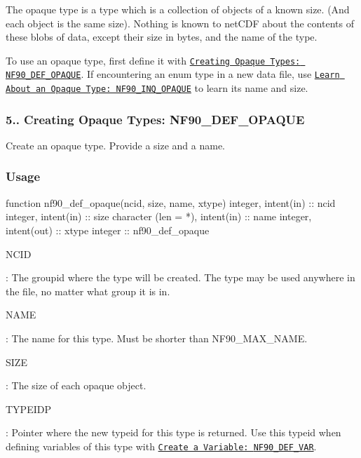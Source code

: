 The opaque type is a type which is a collection of objects of a known size. (And each object is the same size). Nothing is known to net\+C\+DF about the contents of these blobs of data, except their size in bytes, and the name of the type.

To use an opaque type, first define it with \href{#NF90_005fDEF_005fOPAQUE}{\tt Creating Opaque Types\+: N\+F90\+\_\+\+D\+E\+F\+\_\+\+O\+P\+A\+Q\+UE}. If encountering an enum type in a new data file, use \href{#NF90_005fINQ_005fOPAQUE}{\tt Learn About an Opaque Type\+: N\+F90\+\_\+\+I\+N\+Q\+\_\+\+O\+P\+A\+Q\+UE} to learn its name and size.\hypertarget{f90-user-defined-data-types_f90-creating-opaque-types-nf90_def_opaque}{}\subsubsection{5.. Creating Opaque Types\+: N\+F90\+\_\+\+D\+E\+F\+\_\+\+O\+P\+A\+Q\+UE}\label{f90-user-defined-data-types_f90-creating-opaque-types-nf90_def_opaque}
Create an opaque type. Provide a size and a name.

\subsubsection*{Usage}


\begin{DoxyCode}
\textcolor{keyword}{function }nf90\_def\_opaque(ncid, size, name, xtype)
  \textcolor{keywordtype}{integer}, \textcolor{keywordtype}{intent(in)} :: ncid
  \textcolor{keywordtype}{integer}, \textcolor{keywordtype}{intent(in)} :: size
  \textcolor{keywordtype}{character (len = *)}, \textcolor{keywordtype}{intent(in)} :: name
  \textcolor{keywordtype}{integer}, \textcolor{keywordtype}{intent(out)} :: xtype
  \textcolor{keywordtype}{integer} :: nf90\_def\_opaque
\end{DoxyCode}


{\ttfamily N\+C\+ID}

\+: The groupid where the type will be created. The type may be used anywhere in the file, no matter what group it is in.

{\ttfamily N\+A\+ME}

\+: The name for this type. Must be shorter than N\+F90\+\_\+\+M\+A\+X\+\_\+\+N\+A\+ME.

{\ttfamily S\+I\+ZE}

\+: The size of each opaque object.

{\ttfamily T\+Y\+P\+E\+I\+DP}

\+: Pointer where the new typeid for this type is returned. Use this typeid when defining variables of this type with \href{#NF90_005fDEF_005fVAR}{\tt Create a Variable\+: {\ttfamily N\+F90\+\_\+\+D\+E\+F\+\_\+\+V\+AR}}.

